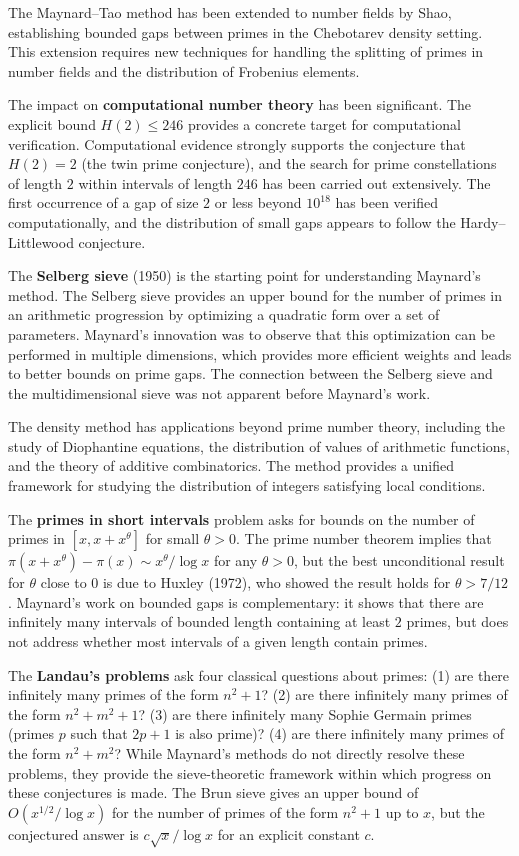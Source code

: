 The Maynard--Tao method has been extended to number fields by Shao, establishing bounded gaps between primes in the Chebotarev density setting. This extension requires new techniques for handling the splitting of primes in number fields and the distribution of Frobenius elements.

The impact on \textbf{computational number theory} has been significant. The explicit bound $H(2) \le 246$ provides a concrete target for computational verification. Computational evidence strongly supports the conjecture that $H(2) = 2$ (the twin prime conjecture), and the search for prime constellations of length $2$ within intervals of length $246$ has been carried out extensively. The first occurrence of a gap of size $2$ or less beyond $10^{18}$ has been verified computationally, and the distribution of small gaps appears to follow the Hardy--Littlewood conjecture.

The \textbf{Selberg sieve} (1950) is the starting point for understanding Maynard's method. The Selberg sieve provides an upper bound for the number of primes in an arithmetic progression by optimizing a quadratic form over a set of parameters. Maynard's innovation was to observe that this optimization can be performed in multiple dimensions, which provides more efficient weights and leads to better bounds on prime gaps. The connection between the Selberg sieve and the multidimensional sieve was not apparent before Maynard's work.

The density method has applications beyond prime number theory, including the study of Diophantine equations, the distribution of values of arithmetic functions, and the theory of additive combinatorics. The method provides a unified framework for studying the distribution of integers satisfying local conditions.

The \textbf{primes in short intervals} problem asks for bounds on the number of primes in $[x, x + x^\theta]$ for small $\theta > 0$. The prime number theorem implies that $\pi(x + x^\theta) - \pi(x) \sim x^\theta / \log x$ for any $\theta > 0$, but the best unconditional result for $\theta$ close to $0$ is due to Huxley (1972), who showed the result holds for $\theta > 7/12$. Maynard's work on bounded gaps is complementary: it shows that there are infinitely many intervals of bounded length containing at least $2$ primes, but does not address whether most intervals of a given length contain primes.

The \textbf{Landau's problems} ask four classical questions about primes: (1) are there infinitely many primes of the form $n^2 + 1$? (2) are there infinitely many primes of the form $n^2 + m^2 + 1$? (3) are there infinitely many Sophie Germain primes (primes $p$ such that $2p+1$ is also prime)? (4) are there infinitely many primes of the form $n^2 + m^2$? While Maynard's methods do not directly resolve these problems, they provide the sieve-theoretic framework within which progress on these conjectures is made. The Brun sieve gives an upper bound of $O(x^{1/2} / \log x)$ for the number of primes of the form $n^2 + 1$ up to $x$, but the conjectured answer is $c \sqrt{x} / \log x$ for an explicit constant $c$.

